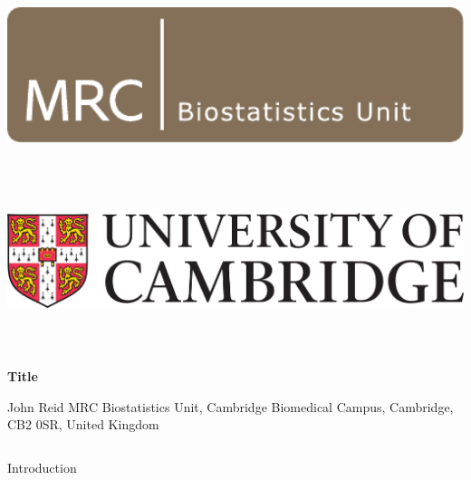 \documentclass[t, final]{beamer}
\begin{document}
\begin{frame}{}

%
\begin{block}{
  \vspace{24pt}

  \includegraphics[height=150pt]{Figures/BSU}
  \hspace{30pt}
  \includegraphics[height=150pt]{Figures/UniCam}

  \vspace{24pt}
}
  \vspace{24pt}

  \fontsize{82pt}{82pt}\selectfont \textcolor{mrcblue}{\textbf{Title}}

  \vspace{24pt}

  \fontsize{36pt}{36pt}\selectfont
  \textcolor{mrcblue}{
    John Reid
    \hspace{30pt}
    MRC Biostatistics Unit,
    Cambridge Biomedical Campus,
    Cambridge, CB2 0SR,
    United Kingdom}
\end{block}


%


%
\begin{columns}[t]
\begin{column}{.32\linewidth}
\begin{block}{Introduction}
  \blindtext
\end{block}


\end{column}
\end{columns}
\end{frame}
\end{document}
